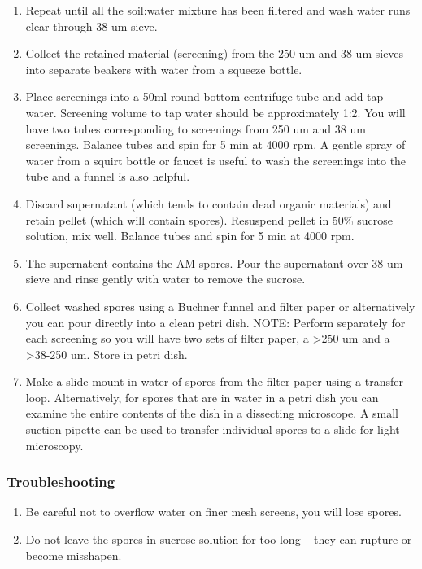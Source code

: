 \documentclass[]{book}
\providecommand{\tightlist}{%
  \setlength{\itemsep}{0pt}\setlength{\parskip}{0pt}}
\begin{document}
\begin{enumerate}
\def\labelenumi{\arabic{enumi}.}
\setcounter{enumi}{3}
\tightlist
\item
  Repeat until all the soil:water mixture has been filtered and wash water runs clear through 38 um sieve.
\item
  Collect the retained material (screening) from the 250 um and 38 um sieves into separate beakers with water from a squeeze bottle.
\item
  Place screenings into a 50ml round-bottom centrifuge tube and add tap water. Screening volume to tap water should be approximately 1:2. You will have two tubes corresponding to screenings from 250 um and 38 um screenings. Balance tubes and spin for 5 min at 4000 rpm. A gentle spray of water from a squirt bottle or faucet is useful to wash the screenings into the tube and a funnel is also helpful.
\item
  Discard supernatant (which tends to contain dead organic materials) and retain pellet (which will contain spores). Resuspend pellet in 50\% sucrose solution, mix well. Balance tubes and spin for 5 min at 4000 rpm.
\item
  The supernatent contains the AM spores. Pour the supernatant over 38 um sieve and rinse gently with water to remove the sucrose.
\item
  Collect washed spores using a Buchner funnel and filter paper or alternatively you can pour directly into a clean petri dish. NOTE: Perform separately for each screening so you will have two sets of filter paper, a \textgreater250 um and a \textgreater38-250 um. Store in petri dish.
\item
  Make a slide mount in water of spores from the filter paper using a transfer loop. Alternatively, for spores that are in water in a petri dish you can examine the entire contents of the dish in a dissecting microscope. A small suction pipette can be used to transfer individual spores to a slide for light microscopy.
\end{enumerate}

\hypertarget{troubleshooting}{%
\subsubsection{Troubleshooting}\label{troubleshooting}}

\begin{enumerate}
\def\labelenumi{\arabic{enumi}.}
\tightlist
\item
  Be careful not to overflow water on finer mesh screens, you will lose spores.
\item
  Do not leave the spores in sucrose solution for too long -- they can rupture or become misshapen.
\end{enumerate}
\end{document}
